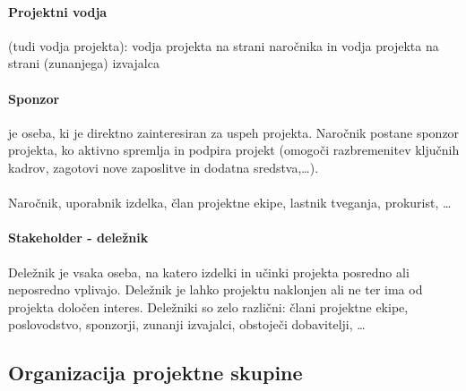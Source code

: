 \documentclass[a4paper,12pt]{report}
\begin{document}
      \paragraph{Projektni vodja} (tudi vodja projekta): vodja projekta na strani naročnika in vodja projekta na strani (zunanjega) izvajalca
      \paragraph{Sponzor} je oseba, ki je direktno zainteresiran za uspeh projekta. Naročnik postane sponzor projekta, ko aktivno spremlja in podpira projekt (omogoči razbremenitev ključnih kadrov, zagotovi nove zaposlitve in dodatna sredstva,\dots).
      \paragraph{} Naročnik, uporabnik izdelka, član projektne ekipe, lastnik tveganja, prokurist, \dots
      \paragraph{Stakeholder - deležnik} Deležnik je vsaka oseba, na katero izdelki in učinki projekta posredno ali neposredno vplivajo. Deležnik je lahko projektu naklonjen ali ne ter ima od projekta določen interes. Deležniki so zelo različni: člani projektne ekipe, poslovodstvo, sponzorji, zunanji izvajalci, obstoječi dobavitelji, \dots

   \subsection{Organizacija projektne skupine}
\end{document}
